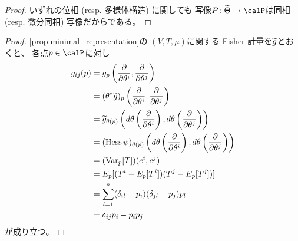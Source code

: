 \documentclass[report]{jlreq}
\begin{document}
\begin{proof}
    いずれの位相 (resp. 多様体構造) に関しても
    写像$P \colon \wt{\Theta} \to \calP$は同相 (resp. 微分同相) 写像だからである。
\end{proof}


\begin{proof}
    \cref{prop:minimal_representation}の
    $(V, T, \mu)$に関する Fisher 計量を$\widetilde{g}$とおくと、
    各点$p \in \calP$に対し
    \begin{alignat}{1}
        g_{ij}(p)
            &=
                g_p \myparen{
                    \deldel{\theta^i},
                    \deldel{\theta^j}
                }
                \\
            &=
                (\theta^* \wt{g})_{p} \myparen{
                    \deldel{\theta^i},
                    \deldel{\theta^j}
                }
                \\
            &=
                \wt{g}_{\theta(p)} \myparen{
                    d\theta \myparen{
                        \deldel{\theta^i}
                    },
                    d\theta \myparen{
                        \deldel{\theta^j}
                    }
                }
                \\
            &=
                (\Hess \psi)_{\theta(p)} \myparen{
                    d\theta \myparen{
                        \deldel{\theta^i}
                    },
                    d\theta \myparen{
                        \deldel{\theta^j}
                    }
                }
                \\
            &=
                (\Var_p [T])(e^i, e^j)
                \\
            &=
                E_p[(T^i - E_p[T^i])(T^j - E_p[T^j])]
                \\
            &=
                \sum_{l = 1}^n
                    (\delta_{il} - p_i)
                    (\delta_{jl} - p_j)
                    p_l
                \\
            &=
                \delta_{ij} p_i - p_i p_j
    \end{alignat}
    が成り立つ。
\end{proof}
\end{document}
